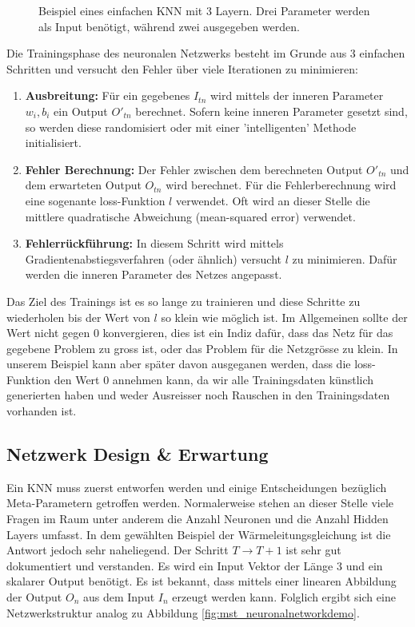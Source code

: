 \begin{figure}[h]
	\centering
	
	\label{fig:mst_neuronalnetwork}
	\caption{Beispiel eines einfachen KNN mit 3 Layern. Drei Parameter werden als Input benötigt, während zwei ausgegeben werden.}
\end{figure}

Die Trainingsphase des neuronalen Netzwerks besteht im Grunde aus 3 einfachen Schritten und versucht den Fehler über viele Iterationen zu minimieren:
\begin{enumerate}
	\item {\textbf{Ausbreitung:} Für ein gegebenes $I_{tn}$ wird mittels der inneren Parameter $w_{i}, b_{i}$ ein Output $O'_{tn}$ berechnet. Sofern keine inneren Parameter gesetzt sind, so werden diese randomisiert oder mit einer 'intelligenten' Methode initialisiert.}
	\item {\textbf{Fehler Berechnung:} Der Fehler zwischen dem berechneten Output $O'_{tn}$ und dem erwarteten Output $O_{tn}$ wird berechnet. Für die Fehlerberechnung wird eine sogenante loss-Funktion $l$ verwendet. Oft wird an dieser Stelle die mittlere quadratische Abweichung (mean-squared error) verwendet.}
	\item{ \textbf{ Fehlerrückführung:} In diesem Schritt wird mittels Gradientenabstiegsverfahren (oder ähnlich) versucht $l$ zu minimieren. Dafür werden die inneren Parameter des Netzes angepasst.}
\end{enumerate}
Das Ziel des Trainings ist es so lange zu trainieren und diese Schritte zu wiederholen bis der Wert von $l$ so klein wie möglich ist. Im Allgemeinen sollte der Wert nicht gegen 0 konvergieren, dies ist ein Indiz dafür, dass das Netz für das gegebene Problem zu gross ist, oder das Problem für die Netzgrösse zu klein. In unserem Beispiel kann aber später davon ausgeganen werden, dass die loss-Funktion den Wert 0 annehmen kann, da wir alle Trainingsdaten künstlich generierten haben und weder Ausreisser noch Rauschen in den Trainingsdaten vorhanden ist.

\subsection{Netzwerk Design \& Erwartung}

Ein KNN muss zuerst entworfen werden und einige Entscheidungen bezüglich Meta-Parametern getroffen werden. Normalerweise stehen an dieser Stelle viele Fragen im Raum unter anderem die Anzahl Neuronen und die Anzahl Hidden Layers umfasst. In dem gewählten Beispiel der Wärmeleitungsgleichung ist die Antwort jedoch sehr naheliegend. Der Schritt $T \rightarrow T+1$ ist sehr gut dokumentiert und verstanden. Es wird ein Input Vektor der Länge 3 und ein skalarer Output benötigt. Es ist bekannt, dass mittels einer linearen Abbildung der Output $O_n$ aus dem Input $I_n$ erzeugt werden kann. Folglich ergibt sich eine Netzwerkstruktur analog zu Abbildung \ref{fig:mst_neuronalnetworkdemo}.

